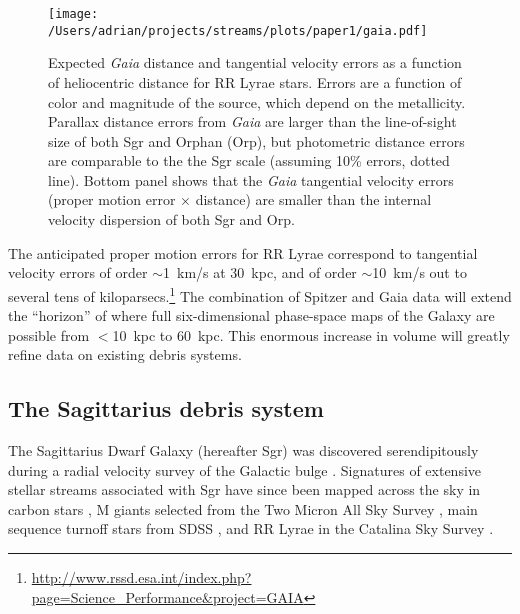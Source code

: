 \documentclass{emulateapj}
\begin{document}
\begin{figure}[h]
\begin{center}
\texttt{[image: /Users/adrian/projects/streams/plots/paper1/gaia.pdf]}
\caption{Expected \emph{Gaia} distance and tangential velocity errors as a function of heliocentric distance for RR Lyrae stars. Errors are a function of color and magnitude of the source, which depend on the metallicity. Parallax distance errors from \emph{Gaia} are larger than the line-of-sight size of both Sgr and Orphan (Orp), but photometric distance errors are comparable to the the Sgr scale (assuming 10\% errors, dotted line). Bottom panel shows that the \emph{Gaia} tangential velocity errors (proper motion error $\times$ distance) are smaller than the internal velocity dispersion of both Sgr and Orp. }\label{fig:gaia_errors}
\end{center}
\end{figure}

The anticipated proper motion errors for RR Lyrae correspond to
tangential velocity errors of order $\sim$1~km/s at 30~kpc, and of
order $\sim$10~km/s out to several tens of
kiloparsecs.\footnote{\url{http://www.rssd.esa.int/index.php?page=Science_Performance&project=GAIA}}
The combination of Spitzer and Gaia data will extend the ``horizon''
of where full six-dimensional phase-space maps of the Galaxy are
possible from $<$10~kpc to 60~kpc. This enormous increase in volume
will greatly refine data on existing debris systems.

\subsection{The Sagittarius debris system}
\label{sec:sgr}
The Sagittarius Dwarf Galaxy (hereafter Sgr) was discovered
serendipitously during a radial velocity survey of the Galactic bulge
\citep{ibata94}. 
Signatures of extensive stellar
streams associated with Sgr have since  been
mapped across the sky in carbon stars \citep{totten98}, M giants
selected from the Two Micron All Sky Survey \citep{majewski03}, main
sequence turnoff stars from SDSS
\citep{belokurov06}, and RR Lyrae in the Catalina Sky Survey
\citep{drake13}. 
\end{document}
